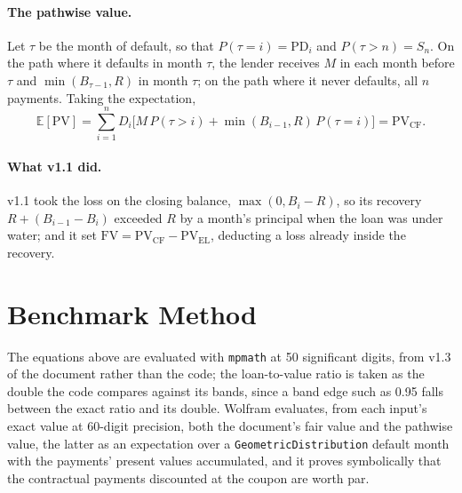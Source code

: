 \documentclass[11pt,a4paper]{article}
\begin{document}
\paragraph{The pathwise value.} Let $\tau$ be the month of default, so that
$P(\tau=i)=\mathrm{PD}_i$ and $P(\tau>n)=S_n$. On the path where it defaults in month
$\tau$, the lender receives $M$ in each month before $\tau$ and $\min(B_{\tau-1},R)$
in month $\tau$; on the path where it never defaults, all $n$ payments. Taking the
expectation,
\begin{equation}
\mathbb{E}[\mathrm{PV}]=\sum_{i=1}^n D_i\bigl[M\,P(\tau>i)+\min(B_{i-1},R)\,P(\tau=i)\bigr]
=\mathrm{PV}_{\mathrm{CF}}.
\end{equation}

\paragraph{What v1.1 did.} v1.1 took the loss on the closing balance,
$\max(0,B_i-R)$, so its recovery $R+(B_{i-1}-B_i)$ exceeded $R$ by a month's principal
when the loan was under water; and it set $\mathrm{FV}=\mathrm{PV}_{\mathrm{CF}}-\mathrm{PV}_{\mathrm{EL}}$,
deducting a loss already inside the recovery.

\section{Benchmark Method}

The equations above are evaluated with \texttt{mpmath} at 50 significant digits, from
v1.3 of the document rather than the code; the loan-to-value ratio is taken as the double the
code compares against its bands, since a band edge such as 0.95 falls between the
exact ratio and its double. Wolfram evaluates, from each input's exact value at
60-digit precision, both the document's fair value and the pathwise value, the
latter as an expectation over a \texttt{GeometricDistribution} default month with the
payments' present values accumulated, and it proves symbolically that the
contractual payments discounted at the coupon are worth par.

\mkmvalidation


\end{document}
